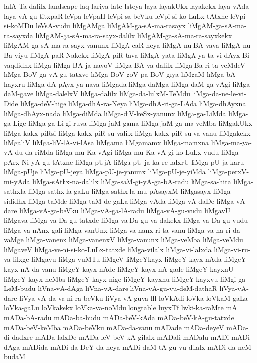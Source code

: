 {lalA-Ta-dalilx
landscape
laq
lariya
late
lateya
laya
layakUkx
layakekx
laya-vAda
laya-vA-gu-titxpaR
leVpa
leVpaH
leVpi-sa-beVku
leVpi-si-ko-LuLx-tAtxne
leVpi-si-koMDu
leVsA-vudu
liMgAMga
liMgAM-ga-sA-ma-rasayx
liMgAM-ga-sA-ma-ra-sayxda
liMgAM-ga-sA-ma-ra-sayx-dalilx
liMgAM-ga-sA-ma-ra-sayxkekx
liMgAM-ga-sA-ma-ra-sayx-vanunx
liMgA-caR-neya
liMgA-nu-BA-vava
liMgA-nu-Ba-viyu
liMgA-paR-Nakekx
liMgA-piR-tava
liMgA-yata
liMgA-ya-ta-vi-dAyx-Bi-vaqdidhx
liMga
liMga-BA-ja-navoV
liMga-BA-va-dalilx
liMga-Ba-ri-ta-veMdeV
liMga-BoV-ga-vA-gu-tatxve
liMga-BoV-goV-pa-BoV-giya
liMgaM
liMga-bA-hayxru
liMga-dA-pAyx-ya-nava
liMgada
liMga-daMga
liMga-daM-ga-vAgi
liMga-daM-gave
liMga-dalelxV
liMga-dalilx
liMga-da-lulxM-TeMdu
liMga-da-ne-le-vi-Dide
liMga-deV-hige
liMga-dhA-ra-Neya
liMga-dhA-ri-ga-LAda
liMga-dhAyxna
liMga-dhAyx-nada
liMga-diMda
liMga-diV-keSx-yanunx
liMga-ga-LiMda
liMga-ga-Lige
liMga-ga-Li-gi-ruva
liMga-jaM-gama
liMga-jaM-ga-ma-veMba
liMgakUkx
liMga-kakx-piRsi
liMga-kakx-piR-su-valilx
liMga-kakx-piR-su-va-vanu
liMgakekx
liMgaliV
liMga-liV-lA-vi-lAsa
liMgama
liMgamamx
liMga-mamxna
liMga-ma-ya-vA-du-da-riMda
liMga-mu-Ka-vAgi
liMga-mu-Ka-vA-gi-ko-LuLx-vudu
liMga-pArx-Ni-yA-gu-tAtxne
liMga-pUjA
liMga-pU-ja-ka-re-lalxrU
liMga-pU-ja-karu
liMga-pUje
liMga-pU-jeya
liMga-pU-je-yanunx
liMga-pU-je-yiMda
liMga-perxV-mi-yAda
liMga-sAthx-na-dalilx
liMga-saM-gi-yA-ga-bA-radu
liMga-sa-hita
liMga-sathxla
liMga-sathx-la-gaLu
liMga-sathx-la-mu-pAsayxM
liMgasayx
liMga-sididhx
liMga-taMde
liMga-taM-de-gaLa
liMga-vAda
liMga-vA-daDe
liMga-vA-dare
liMga-vA-ga-beVku
liMga-vA-ga-lA-radu
liMga-vA-gu-vudu
liMgavU
liMgava
liMga-va-Da-gu-tatxde
liMga-va-Da-gu-va-dakekx
liMga-va-Da-gu-vudu
liMga-va-nAnx-gali
liMga-vanUnx
liMga-va-nanx-ri-ta-vanu
liMga-va-na-ri-da-vaMge
liMga-vanenx
liMga-vanenxV
liMga-vanunx
liMga-veMba
liMga-veMdu
liMgaveV
liMga-ve-ni-si-ko-LuLx-tatxde
liMga-vilalx
liMga-vi-lalxda
liMga-vi-ru-va-lilxge
liMgavu
liMga-vuMTu
liMgeV
liMgeYkayx
liMgeY-kayx-nAda
liMgeY-kayx-nA-da-vanu
liMgeY-kayx-nAde
liMgeY-kayx-nA-gade
liMgeY-kayxnU
liMgeY-kayx-neMba
liMgeY-kayx-nige
liMgeY-kayxnu
liMgeY-kayxvu
liMgi-ga-LeM-budu
liVna-vA-dAga
liVna-vA-dare
liVna-vA-gu-vu-deM-dathaR
liVya-vA-dare
liVya-vA-da-va-ni-ra-beVku
liVya-vA-guva
lll
loVkAdi
loVka
loVkaM-gaLa
loVka-gaLu
loVkakekx
loVka-va-noMdu
longtable
luyxTf
lwki-ka-raMte
mA
mADa-bA-radu
mADa-ba-hudu
mADa-beV-kAda
mADa-beV-kA-gu-tatxde
mADa-beV-keMba
mADa-beVku
mADa-da-vanu
mADade
mADa-deyeV
mADa-di-dadxre
mADa-lalxDe
mADa-leV-beV-kA-gilalx
mADali
mADalu
mADi
mADi-dAga
mADida
mADi-da-DeY-da-neya
mADi-daM-tA-gu-vu-dilalx
mADi-da-neM-budaM
}
